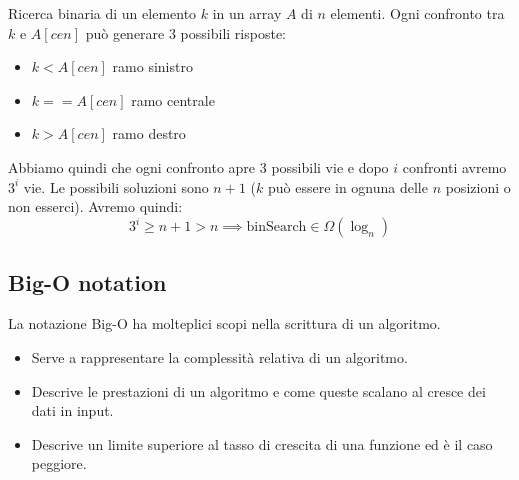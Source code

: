 \begin{itemize}
\begin{note}
\begin{itemize}
		\end{itemize}
	\end{note}
	\begin{example} Ricerca binaria di un elemento $k$ in un array $A$ di $n$ elementi. Ogni confronto tra $k$ e $A[cen]$ può generare 3 possibili risposte:
		\begin{itemize}
			\item $k < A[cen]$ ramo sinistro
			\item $k == A[cen]$ ramo centrale
			\item $k > A[cen]$ ramo destro
		\end{itemize}
	Abbiamo quindi che ogni confronto apre 3 possibili vie e dopo $i$ confronti avremo $3^i$ vie. Le possibili soluzioni sono $n+1$ ($k$ può essere in ognuna delle $n$ posizioni o non esserci). Avremo quindi:
	\begin{equation}
		3^i \geq n+1 > n \implies \text{binSearch} \in \Omega(\log_n)
	\end{equation}
		
	\end{example}
\end{itemize}

\subsection{Big-O notation}
La notazione Big-O ha molteplici scopi nella scrittura di un algoritmo.
\begin{itemize}
	\item Serve a rappresentare la complessità relativa di un algoritmo.
	\item Descrive le prestazioni di un algoritmo e come queste scalano al cresce dei dati in input.
	\item Descrive un limite superiore al tasso di crescita di una funzione ed è il caso peggiore.
\end{itemize}

